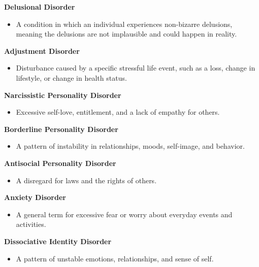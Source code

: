 \textbf{Delusional Disorder}

\begin{itemize}
\tightlist
\item
  A condition in which an individual experiences non-bizarre delusions,
  meaning the delusions are not implausible and could happen in reality.
\end{itemize}

\textbf{Adjustment Disorder}

\begin{itemize}
\tightlist
\item
  Disturbance caused by a specific stressful life event, such as a loss,
  change in lifestyle, or change in health status.
\end{itemize}

\textbf{Narcissistic Personality Disorder}

\begin{itemize}
\tightlist
\item
  Excessive self-love, entitlement, and a lack of empathy for others.
\end{itemize}

\textbf{Borderline Personality Disorder}

\begin{itemize}
\tightlist
\item
  A pattern of instability in relationships, moods, self-image, and
  behavior.
\end{itemize}

\textbf{Antisocial Personality Disorder}

\begin{itemize}
\tightlist
\item
  A disregard for laws and the rights of others.
\end{itemize}

\textbf{Anxiety Disorder}

\begin{itemize}
\tightlist
\item
  A general term for excessive fear or worry about everyday events and
  activities.
\end{itemize}

\textbf{Dissociative Identity Disorder}

\begin{itemize}
\tightlist
\item
  A pattern of unstable emotions, relationships, and sense of self.
\end{itemize}

